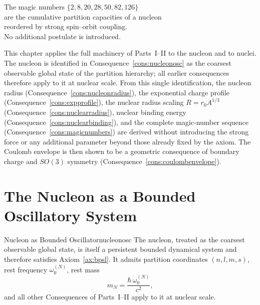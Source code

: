
\epigraph{%
  The magic numbers $\{2, 8, 20, 28, 50, 82, 126\}$\\
  are the cumulative partition capacities of a nucleon\\
  reordered by strong spin--orbit coupling.\\
  No additional postulate is introduced.%
}{}

This chapter applies the full machinery of Parts~I--II to the nucleon and
to nuclei.  The nucleon is identified in
Consequence~\ref{cons:nucleonosc} as the coarsest observable global state of
the partition hierarchy; all earlier consequences therefore apply to it at
nuclear scale.  From this single identification, the nucleon radius
(Consequence~\ref{cons:nucleonradius}), the exponential charge profile
(Consequence~\ref{cons:expprofile}), the nuclear radius scaling $R=r_{0}A^{1/3}$
(Consequence~\ref{cons:nuclearradius}), nuclear binding energy
(Consequence~\ref{cons:nuclearbinding}), and the complete magic-number
sequence (Consequence~\ref{cons:magicnumbers}) are derived without introducing
the strong force or any additional parameter beyond those already fixed by the
axiom.  The Coulomb envelope is then shown to be a geometric consequence of
boundary charge and $SO(3)$ symmetry
(Consequence~\ref{cons:coulombenvelope}).

\section{The Nucleon as a Bounded Oscillatory System}
\label{sec:nucleonoscillator}

\begin{consequence}{Nucleon as Bounded Oscillator}{nucleonosc}
The nucleon, treated as the coarsest observable global state, is itself a
persistent bounded dynamical system and therefore satisfies Axiom~\ref{ax:bpsl}.
It admits partition coordinates $(n,l,m,s)$, rest frequency
$\omega_{0}^{(N)}$, rest mass
\begin{equation}
  m_{N} = \frac{\hbar\,\omega_{0}^{(N)}}{c^{2}},
  \label{eq:nucleonmass}
\end{equation}
and all other Consequences of Parts~I--II apply to it at nuclear scale.
\end{consequence}

